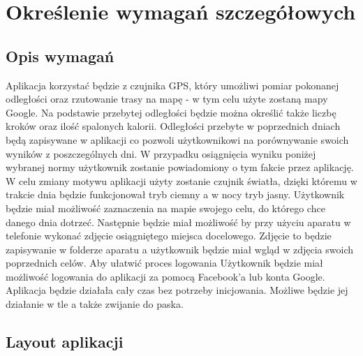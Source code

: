 	\newpage
\section{Określenie wymagań szczegółowych}		%

\subsection{Opis wymagań}

\hspace{1cm}Aplikacja korzystać będzie z czujnika GPS, który umożliwi pomiar pokonanej odległości oraz rzutowanie trasy na mapę - w tym celu użyte zostaną mapy Google. Na podstawie przebytej odległości będzie można określić także liczbę kroków oraz ilość spalonych kalorii. Odległości przebyte w poprzednich dniach będą zapisywane w aplikacji co pozwoli użytkownikowi na porównywanie swoich wyników z poszczególnych dni. W przypadku osiągnięcia wyniku poniżej wybranej normy użytkownik zostanie powiadomiony o tym fakcie przez aplikację. 
W celu zmiany motywu aplikacji użyty zostanie czujnik światła, dzięki któremu w trakcie dnia będzie funkcjonował tryb ciemny a w nocy tryb jasny. 
Użytkownik będzie miał możliwość zaznaczenia na mapie swojego celu, do którego chce danego dnia dotrzeć. Następnie będzie miał możliwość by przy użyciu aparatu w telefonie wykonać zdjęcie osiągniętego miejsca docelowego. Zdjęcie to będzie zapisywanie w folderze aparatu a użytkownik będzie miał wgląd w zdjęcia swoich poprzednich celów.
Aby ułatwić proces logowania Użytkownik będzie miał możliwość logowania do aplikacji za pomocą Facebook’a lub konta Google.
Aplikacja będzie działała cały czas bez potrzeby inicjowania. Możliwe będzie jej działanie w tle a także zwijanie do paska.

\subsection{Layout aplikacji}

